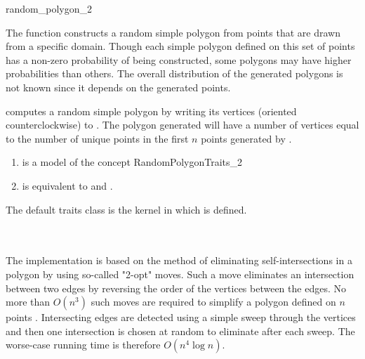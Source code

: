 
\begin{ccRefFunction}{random_polygon_2}

\ccDefinition

The function \ccRefName{} constructs a random simple polygon 
from points that are drawn from a specific domain.
Though each simple polygon defined on this set of 
points has a non-zero probability of being constructed, some polygons may 
have higher probabilities than others.  The overall distribution of the
generated polygons is not known since it depends on the generated points.



{
computes a random simple polygon by writing its vertices (oriented
counterclockwise) to . The polygon generated will have a number
of vertices equal to the number of unique points in the first $n$ points
generated by . 
}

\ccRequirements
\begin{enumerate}
\item {} is a model of the concept RandomPolygonTraits\_2
\item {} is equivalent to
       and .
\end{enumerate}

The default traits class  is the kernel in which
 is defined.%

\ccSeeAlso 
{} \\
 \\

\ccImplementation 
The implementation is based on the method of eliminating self-intersections in
a polygon by using so-called "2-opt" moves.  Such a move eliminates an 
intersection between two edges by reversing the order of the vertices between 
the edges.  No more than $O(n^3)$ such moves are required to simplify a polygon
defined on $n$ points \cite{ls-utstp-82}.
Intersecting edges are detected using a simple sweep through the vertices
and then one intersection is chosen at random to eliminate after each sweep. 
The worse-case running time is therefore $O(n^4 \log n)$.


\end{ccRefFunction}
